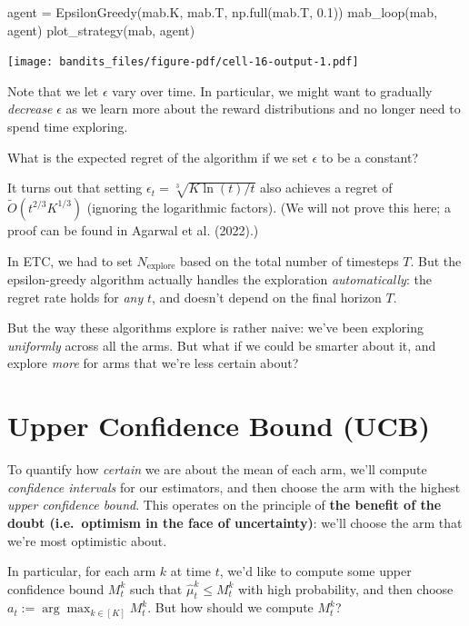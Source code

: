 \documentclass[
  letterpaper,
  DIV=11,
  numbers=noendperiod]{scrreprt}
\newenvironment{Shaded}{\begin{snugshade}}{\end{snugshade}}
\newcommand{\FloatTok}[1]{\textcolor[rgb]{0.68,0.00,0.00}{#1}}
\newcommand{\NormalTok}[1]{\textcolor[rgb]{0.00,0.23,0.31}{#1}}
\newcommand{\OperatorTok}[1]{\textcolor[rgb]{0.37,0.37,0.37}{#1}}
\theoremstyle{plain}
\theoremstyle{plain}
\theoremstyle{definition}
\theoremstyle{definition}
\theoremstyle{remark}
\begin{document}
\begin{Shaded}
\begin{Highlighting}[]
\NormalTok{agent }\OperatorTok{=}\NormalTok{ EpsilonGreedy(mab.K, mab.T, np.full(mab.T, }\FloatTok{0.1}\NormalTok{))}
\NormalTok{mab\_loop(mab, agent)}
\NormalTok{plot\_strategy(mab, agent)}
\end{Highlighting}
\end{Shaded}

\texttt{[image: bandits\_files/figure-pdf/cell-16-output-1.pdf]}

Note that we let \(\epsilon\) vary over time. In particular, we might
want to gradually \emph{decrease} \(\epsilon\) as we learn more about
the reward distributions and no longer need to spend time exploring.

What is the expected regret of the algorithm if we set \(\epsilon\) to
be a constant?

It turns out that setting \(\epsilon_t = \sqrt[3]{K \ln(t)/t}\) also
achieves a regret of \(\tilde O(t^{2/3} K^{1/3})\) (ignoring the
logarithmic factors). (We will not prove this here; a proof can be found
in Agarwal et al. (2022).)

In ETC, we had to set \(N_{\text{explore}}\) based on the total number
of timesteps \(T\). But the epsilon-greedy algorithm actually handles
the exploration \emph{automatically}: the regret rate holds for
\emph{any} \(t\), and doesn't depend on the final horizon \(T\).

But the way these algorithms explore is rather naive: we've been
exploring \emph{uniformly} across all the arms. But what if we could be
smarter about it, and explore \emph{more} for arms that we're less
certain about?

\section{Upper Confidence Bound (UCB)}\label{sec-ucb}

To quantify how \emph{certain} we are about the mean of each arm, we'll
compute \emph{confidence intervals} for our estimators, and then choose
the arm with the highest \emph{upper confidence bound}. This operates on
the principle of \textbf{the benefit of the doubt (i.e.~optimism in the
face of uncertainty)}: we'll choose the arm that we're most optimistic
about.

In particular, for each arm \(k\) at time \(t\), we'd like to compute
some upper confidence bound \(M^k_t\) such that
\(\hat \mu^k_t \le M^k_t\) with high probability, and then choose
\(a_t := \arg \max_{k \in [K]} M^k_t\). But how should we compute
\(M^k_t\)?
\end{document}

